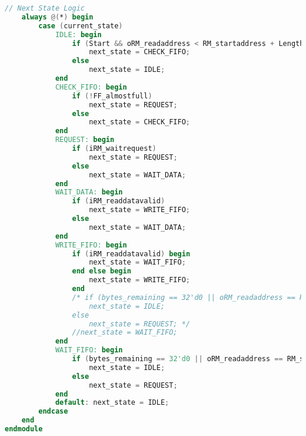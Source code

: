 \begin{lstlisting}[language=Verilog, caption={READ\_MASTER.v - Avalon Read Master Module}, label=lst:verilog_readmaster]
    // Next State Logic
    always @(*) begin
        case (current_state)
            IDLE: begin
                if (Start && oRM_readaddress < RM_startaddress + Length && !FF_almostfull)
                    next_state = CHECK_FIFO;
                else
                    next_state = IDLE;
            end
            CHECK_FIFO: begin
                if (!FF_almostfull)
                    next_state = REQUEST;
                else
                    next_state = CHECK_FIFO;
            end
            REQUEST: begin
                if (iRM_waitrequest)
                    next_state = REQUEST;
                else
                    next_state = WAIT_DATA;
            end
            WAIT_DATA: begin
                if (iRM_readdatavalid)
                    next_state = WRITE_FIFO;
                else
                    next_state = WAIT_DATA;
            end
            WRITE_FIFO: begin
                if (iRM_readdatavalid) begin
                    next_state = WAIT_FIFO;
                end else begin
                    next_state = WRITE_FIFO;
                end
                /* if (bytes_remaining == 32'd0 || oRM_readaddress == RM_startaddress + Length || FF_almostfull)
                    next_state = IDLE;
                else
                    next_state = REQUEST; */
                //next_state = WAIT_FIFO;
            end
            WAIT_FIFO: begin
                if (bytes_remaining == 32'd0 || oRM_readaddress == RM_startaddress + Length || FF_almostfull)
                    next_state = IDLE;
                else
                    next_state = REQUEST;
            end
            default: next_state = IDLE;
        endcase
    end
endmodule
\end{lstlisting}

